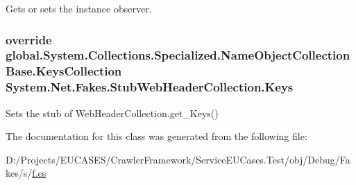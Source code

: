 Gets or sets the instance observer.

\hypertarget{class_system_1_1_net_1_1_fakes_1_1_stub_web_header_collection_a412865a43a1bd7daacc23f06888901cb}{
\subsubsection[{Keys}]{\setlength{\rightskip}{0pt plus 5cm}override global.\-System.\-Collections.\-Specialized.\-Name\-Object\-Collection\-Base.\-Keys\-Collection System.\-Net.\-Fakes.\-Stub\-Web\-Header\-Collection.\-Keys\hspace{0.3cm}{\ttfamily [get]}}}\label{class_system_1_1_net_1_1_fakes_1_1_stub_web_header_collection_a412865a43a1bd7daacc23f06888901cb}


Sets the stub of Web\-Header\-Collection.\-get\-\_\-\-Keys()



The documentation for this class was generated from the following file\-:\begin{DoxyCompactItemize}
\item 
D\-:/\-Projects/\-E\-U\-C\-A\-S\-E\-S/\-Crawler\-Framework/\-Service\-E\-U\-Cases.\-Test/obj/\-Debug/\-Fakes/s/\hyperlink{s_2f_8cs}{f.\-cs}\end{DoxyCompactItemize}
